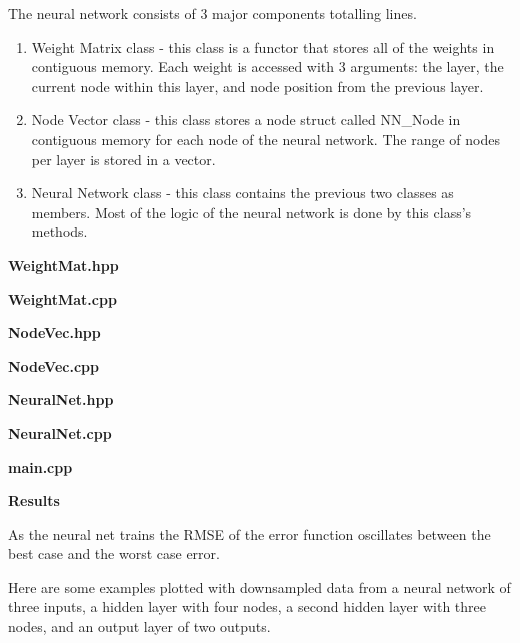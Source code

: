 \documentclass[14pt]{article}
\begin{document}
\begin{flushleft}
The neural network consists of 3 major components totalling lines.
\begin{enumerate}
	\item Weight Matrix class - this class is a functor that stores all of the weights in contiguous memory.
		Each weight is accessed with 3 arguments:
		the layer, the current node within this layer, and node position from the previous layer.
	\item Node Vector class - this class stores a node struct called NN\_Node in contiguous memory
		for each node of the neural network. The range of nodes per layer is stored in a vector.
	\item Neural Network class - this class contains the previous two classes as members.
		Most of the logic of the neural network is done by this class's methods.
\end{enumerate}


	\textbf{WeightMat.hpp}

	\textbf{WeightMat.cpp}


	\textbf{NodeVec.hpp}

	\textbf{NodeVec.cpp}


	\textbf{NeuralNet.hpp}

	\textbf{NeuralNet.cpp}


	\textbf{main.cpp}

\textbf{Results}


As the neural net trains the RMSE of the error function oscillates between the best case and the worst case error.

Here are some examples plotted with downsampled data from
a neural network of three inputs, a hidden layer with four nodes, a second hidden layer with three nodes,
and an output layer of two outputs.



\end{flushleft}
\end{document}

